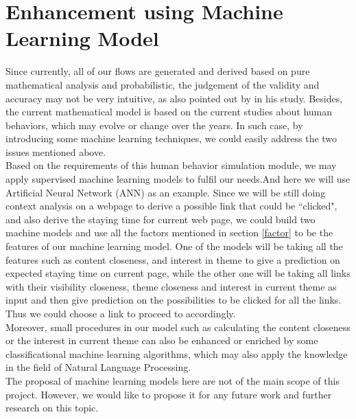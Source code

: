 \documentclass[12pt]{report}
\begin{document}
\section{Enhancement using Machine Learning Model}
Since currently, all of our flows are generated and derived based on pure mathematical analysis and probabilistic, the judgement of the validity and accuracy may not be very intuitive, as also pointed out by \citet{yang} in his study. Besides, the current mathematical model is based on the current studies about human behaviors, which may evolve or change over the years. In such case, by introducing some machine learning techniques, we could easily address the two issues mentioned above.\\

Based on the requirements of this human behavior simulation module, we may apply supervised machine learning models to fulfil our needs.And here we will use Artificial Neural Network (ANN) as an example. Since we will be still doing context analysis on a webpage to derive a possible link that could be ``clicked", and also derive the staying time for current web page, we could build two machine models and use all the factors mentioned in section \ref{factor} to be the features of our machine learning model. One of the models will be taking all the features such as content closeness, and interest in theme to give a prediction on expected staying time on current page, while the other one will be taking all links with their visibility closeness, theme closeness and interest in current theme as input and then give prediction on the possibilities to be clicked for all the links. Thus we could choose a link to proceed to accordingly.\\

Moreover, small procedures in our model such as calculating the content closeness or the interest in current theme can also be enhanced or enriched by some classificational machine learning algorithms, which may also apply the knowledge in the field of Natural Language Processing.\\

The proposal of machine learning models here are not of the main scope of this project. However, we would like to propose it for any future work and further research on this topic.

\pagebreak

 
\end{document}
